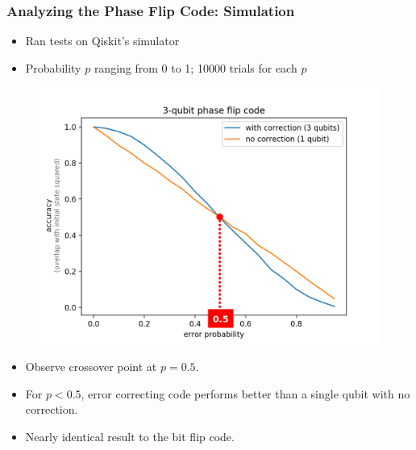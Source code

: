 \documentclass{beamer}
\begin{document}
\begin{frame}
    \frametitle{Analyzing the Phase Flip Code: Simulation}
    \begin{itemize}
        \item Ran tests on Qiskit's simulator
        \item Probability $p$ ranging from 0 to 1; 10000 trials for each $p$
        
        
    \end{itemize}
    \begin{minipage}{0.45\textwidth}
        \begin{figure}[H]
        \includegraphics[scale=0.16]{3qb-pf-overlay.png}
        \end{figure}
        \end{minipage} \hfill
        \begin{minipage}{0.45\textwidth}
        \begin{itemize}
        \item Observe crossover point at $p=0.5$.
        \item For $p<0.5$, error correcting code performs better than a single qubit with no correction.
        \item Nearly identical result to the bit flip code.
        \end{itemize}
    \end{minipage}
\end{frame}
\end{document}
